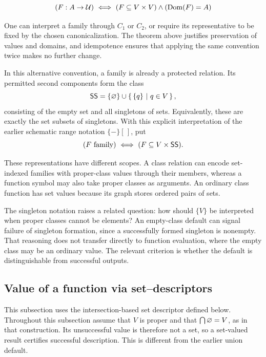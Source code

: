 \begin{definition}[family]
\[
(F:A\to\mathcal{U})
\ \Longleftrightarrow\ 
(F\subseteq V\times V)
\land
(\mathrm{Dom}(F)=A)
\]
\end{definition}
\begin{definition}
One can interpret a family through $C_1$ or $C_2$, or require its
representative to be fixed by the chosen canonicalization. The theorem above
justifies preservation of values and domains, and idempotence ensures that
applying the same convention twice makes no further change.
\end{definition}



\begin{definition}[family]
In this alternative convention, a family is already a protected relation.
Its permitted second components form the class
\[
\mathsf{SS}=\{\varnothing\}\cup\left\{\,\{q\}\ \middle|\ q\in V\,\right\},
\]
consisting of the empty set and all singletons of sets. Equivalently,
these are exactly the set subsets of singletons. With this explicit
interpretation of the earlier schematic range notation $\{-\}[\,]$, put
\[
(F\mathrm{\ family})\ \Longleftrightarrow\ (F\subseteq V\times\mathsf{SS}).
\]
\end{definition}
These representations have different scopes. A class relation can encode
set-indexed families with proper-class values through their members, whereas
a function symbol may also take proper classes as arguments. An ordinary
class function has set values because its graph stores ordered pairs of sets.

The singleton notation raises a related question: how should $\{V\}$ be
interpreted when proper classes cannot be elements? An empty-class default
can signal failure of singleton formation, since a successfully formed
singleton is nonempty. That reasoning does not transfer directly to function
evaluation, where the empty class may be an ordinary value. The relevant
criterion is whether the default is distinguishable from successful outputs.

\subsection{Value of a function via set--descriptors}
This subsection uses the intersection-based set descriptor defined below.
Throughout this subsection assume that $V$ is proper and that
$\bigcap\varnothing=V$, as in that construction. Its unsuccessful
value is therefore not a set, so a set-valued result certifies successful
description. This is different from the earlier union default.

